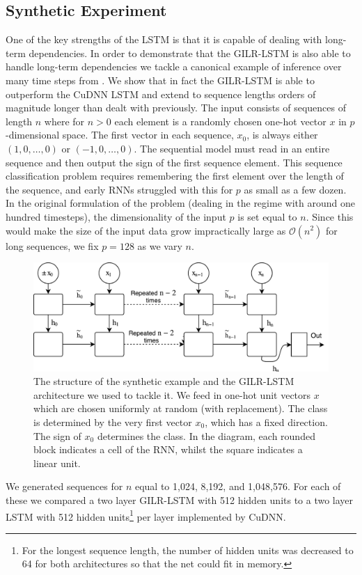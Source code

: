 \documentclass{article}
\begin{document}
\subsection{Synthetic Experiment}
One of the key strengths of the LSTM is that it is capable of dealing with
long-term dependencies. In order to demonstrate that the GILR-LSTM is also able
to handle long-term dependencies we tackle a canonical example of inference over
many time steps from \citet{hochreiter1997long}.  We show that in fact the
GILR-LSTM is able to outperform the CuDNN LSTM and extend to sequence lengths
orders of magnitude longer than dealt with previously. The input consists of
sequences of length $n$ where for $n > 0$ each element is a randomly chosen
one-hot vector \(x\) in $p$-dimensional space.  The first vector in each
sequence, \(x_0\), is always either \((1, 0, \ldots, 0)\) or \((-1, 0, \ldots,
0)\). The sequential model must read in an entire sequence and then output the
sign of the first sequence element.  This sequence classification problem
requires remembering the first element over the length of the sequence, and
early RNNs struggled with this for \(p\) as small as a few dozen. In the
original formulation of the problem (dealing in the regime with around one
hundred timesteps), the dimensionality of the input \(p\) is set equal to
\(n\). Since this would make the size of the input data grow impractically large
as \(\mathcal{O}(n^2)\) for long sequences, we fix \(p = 128\) as we vary \(n\).
\begin{figure}[] \centering
\includegraphics[width=12cm]{synthetic_diagram.pdf}
\caption{The structure of the synthetic example and the GILR-LSTM architecture
we used to tackle it. We feed in one-hot unit vectors \(x\) which are chosen
uniformly at random (with replacement). The class is determined by the very
first vector \(x_0\), which has a fixed direction. The sign of \(x_0\)
determines the class. In the diagram, each rounded block indicates a cell of the
RNN, whilst the square indicates a linear unit.}
\label{fig:synthetic_diagram}
\end{figure} We generated sequences for $n$ equal to 1,024, 8,192, and
1,048,576. For each of these we compared a two layer GILR-LSTM with 512 hidden
units to a two layer LSTM with 512 hidden units\footnote{For the longest
sequence length, the number of hidden units was decreased to 64 for both
architectures so that the net could fit in memory.} per layer implemented by
CuDNN.
\end{document}
